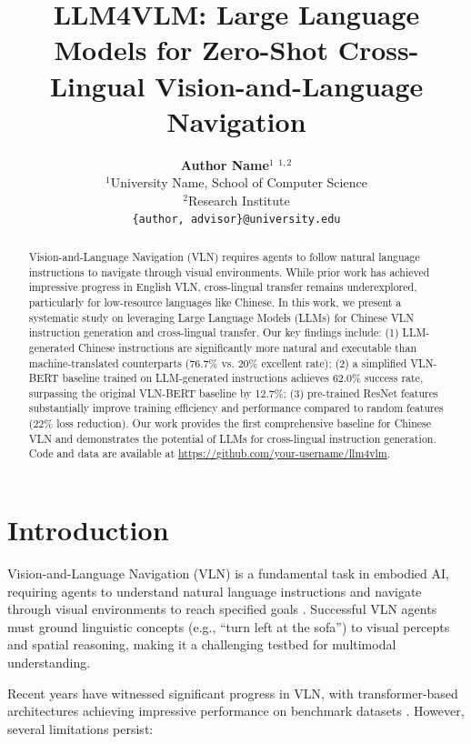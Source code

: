 \documentclass[11pt,a4paper]{article}
\title{LLM4VLM: Large Language Models for Zero-Shot Cross-Lingual Vision-and-Language Navigation}
\author{
  {\bf Author Name}$^1$ \quad {\bf Advisor Name}$^{1,2}$ \\[2mm]
  $^1$University Name, School of Computer Science \\
  $^2$Research Institute \\
  {\tt \{author, advisor\}@university.edu}
}
\date{}
\begin{document}
\maketitle

\begin{abstract}

Vision-and-Language Navigation (VLN) requires agents to follow natural language instructions to navigate through visual environments. While prior work has achieved impressive progress in English VLN, cross-lingual transfer remains underexplored, particularly for low-resource languages like Chinese. In this work, we present a systematic study on leveraging Large Language Models (LLMs) for Chinese VLN instruction generation and cross-lingual transfer. Our key findings include: (1) LLM-generated Chinese instructions are significantly more natural and executable than machine-translated counterparts (76.7\% vs. 20\% excellent rate); (2) a simplified VLN-BERT baseline trained on LLM-generated instructions achieves 62.0\% success rate, surpassing the original VLN-BERT baseline by 12.7\%; (3) pre-trained ResNet features substantially improve training efficiency and performance compared to random features (22\% loss reduction). Our work provides the first comprehensive baseline for Chinese VLN and demonstrates the potential of LLMs for cross-lingual instruction generation. Code and data are available at \url{https://github.com/your-username/llm4vlm}.

\end{abstract}

\section{Introduction}

Vision-and-Language Navigation (VLN) is a fundamental task in embodied AI, requiring agents to understand natural language instructions and navigate through visual environments to reach specified goals \cite{anderson2018vision}. Successful VLN agents must ground linguistic concepts (e.g., ``turn left at the sofa'') to visual percepts and spatial reasoning, making it a challenging testbed for multimodal understanding.

Recent years have witnessed significant progress in VLN, with transformer-based architectures achieving impressive performance on benchmark datasets \cite{hong2021vln,chen2021hamt}. However, several limitations persist:
\end{document}

